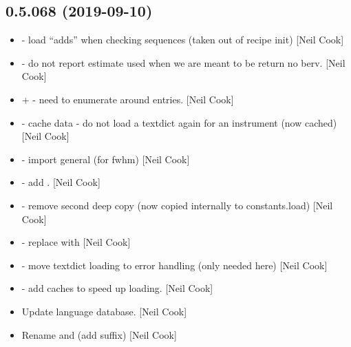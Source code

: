 \documentclass[a4paper,10pt,english]{report}
\begin{document}
\subsection{0.5.068 (2019-09-10)}
\label{\detokenize{misc/changelog:id74}}\begin{itemize}
\item {} 
 - load “adds” when checking
sequences (taken out of recipe init) {[}Neil Cook{]}

\item {} 
 - do not report estimate used when we are
meant to be return no berv. {[}Neil Cook{]}

\item {} 
 +  - need to
enumerate around entries. {[}Neil Cook{]}

\item {} 
 - cache data - do not load a textdict again
for an instrument (now cached) {[}Neil Cook{]}

\item {} 
 - import general (for fwhm) {[}Neil Cook{]}

\item {} 
 - add . {[}Neil
Cook{]}

\item {} 
 - remove second deep copy (now copied internally to
constants.load) {[}Neil Cook{]}

\item {} 
 - replace  with 
{[}Neil Cook{]}

\item {} 
 - move textdict loading to error handling
(only needed here) {[}Neil Cook{]}

\item {} 
 - add caches to speed up loading.
{[}Neil Cook{]}

\item {} 
Update language database. {[}Neil Cook{]}

\item {} 
Rename  and  (add  suffix) {[}Neil Cook{]}


\end{itemize}
\end{document}
